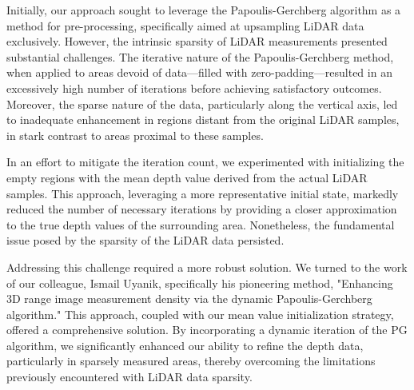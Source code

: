 \documentclass[conference]{IEEEtran}
\begin{document}
Initially, our approach sought to leverage the Papoulis-Gerchberg algorithm as a method for pre-processing, specifically aimed at upsampling LiDAR data exclusively. However, the intrinsic sparsity of LiDAR measurements presented substantial challenges. The iterative nature of the Papoulis-Gerchberg method, when applied to areas devoid of data—filled with zero-padding—resulted in an excessively high number of iterations before achieving satisfactory outcomes. Moreover, the sparse nature of the data, particularly along the vertical axis, led to inadequate enhancement in regions distant from the original LiDAR samples, in stark contrast to areas proximal to these samples.

In an effort to mitigate the iteration count, we experimented with initializing the empty regions with the mean depth value derived from the actual LiDAR samples. This approach, leveraging a more representative initial state, markedly reduced the number of necessary iterations by providing a closer approximation to the true depth values of the surrounding area. Nonetheless, the fundamental issue posed by the sparsity of the LiDAR data persisted.

Addressing this challenge required a more robust solution. We turned to the work of our colleague, Ismail Uyanik, specifically his pioneering method, "Enhancing 3D range image measurement density via the dynamic Papoulis-Gerchberg algorithm." This approach, coupled with our mean value initialization strategy, offered a comprehensive solution. By incorporating a dynamic iteration of the PG algorithm, we significantly enhanced our ability to refine the depth data, particularly in sparsely measured areas, thereby overcoming the limitations previously encountered with LiDAR data sparsity.


\end{document}

